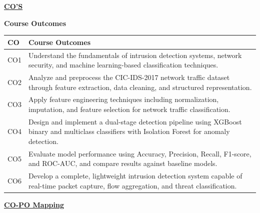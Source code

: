 \documentclass[12pt,a4paper]{report}
\begin{document}
\vspace{0.3cm}
\begin{center}
{\bfseries\color{red}\underline{CO'S}}
\end{center}
{\bfseries\color{mydarkblue}\centering Course Outcomes\par}

\vspace{0.1cm}
{\small
\noindent
\begin{tabular}{|p{}|p{}|}
\hline
\rowcolor{jntuyellow!60}\textbf{CO} & \textbf{Course Outcomes} \\
\hline
CO1 & Understand the fundamentals of intrusion detection systems, network security, and machine learning-based classification techniques. \\
\hline
CO2 & Analyze and preprocess the CIC-IDS-2017 network traffic dataset through feature extraction, data cleaning, and structured representation. \\
\hline
CO3 & Apply feature engineering techniques including normalization, imputation, and feature selection for network traffic classification. \\
\hline
CO4 & Design and implement a dual-stage detection pipeline using XGBoost binary and multiclass classifiers with Isolation Forest for anomaly detection. \\
\hline
CO5 & Evaluate model performance using Accuracy, Precision, Recall, F1-score, and ROC-AUC, and compare results against baseline models. \\
\hline
CO6 & Develop a complete, lightweight intrusion detection system capable of real-time packet capture, flow aggregation, and threat classification. \\
\hline
\end{tabular}
}

\vspace{0.25cm}
\begin{center}
{\bfseries\color{red}\underline{CO-PO Mapping}}
\end{center}
\end{document}
